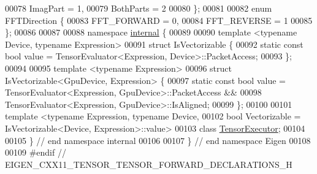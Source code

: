 \begin{DoxyCode}
00078   ImagPart = 1,
00079   BothParts = 2
00080 \};
00081 
00082 \textcolor{keyword}{enum} FFTDirection \{
00083     FFT\_FORWARD = 0,
00084     FFT\_REVERSE = 1
00085 \};
00086 
00087 
00088 \textcolor{keyword}{namespace }\hyperlink{namespaceinternal}{internal} \{
00089 
00090 \textcolor{keyword}{template} <\textcolor{keyword}{typename} Device, \textcolor{keyword}{typename} Expression>
00091 \textcolor{keyword}{struct }IsVectorizable \{
00092   \textcolor{keyword}{static} \textcolor{keyword}{const} \textcolor{keywordtype}{bool} value = TensorEvaluator<Expression, Device>::PacketAccess;
00093 \};
00094 
00095 \textcolor{keyword}{template} <\textcolor{keyword}{typename} Expression>
00096 \textcolor{keyword}{struct }IsVectorizable<GpuDevice, Expression> \{
00097   \textcolor{keyword}{static} \textcolor{keyword}{const} \textcolor{keywordtype}{bool} value = TensorEvaluator<Expression, GpuDevice>::PacketAccess &&
00098                             TensorEvaluator<Expression, GpuDevice>::IsAligned;
00099 \};
00100 
00101 \textcolor{keyword}{template} <\textcolor{keyword}{typename} Expression, \textcolor{keyword}{typename} Device,
00102           \textcolor{keywordtype}{bool} Vectorizable = IsVectorizable<Device, Expression>::value>
00103 \textcolor{keyword}{class }\hyperlink{class_tensor_executor}{TensorExecutor};
00104 
00105 \}  \textcolor{comment}{// end namespace internal}
00106 
00107 \}  \textcolor{comment}{// end namespace Eigen}
00108 
00109 \textcolor{preprocessor}{#endif // EIGEN\_CXX11\_TENSOR\_TENSOR\_FORWARD\_DECLARATIONS\_H}
\end{DoxyCode}
